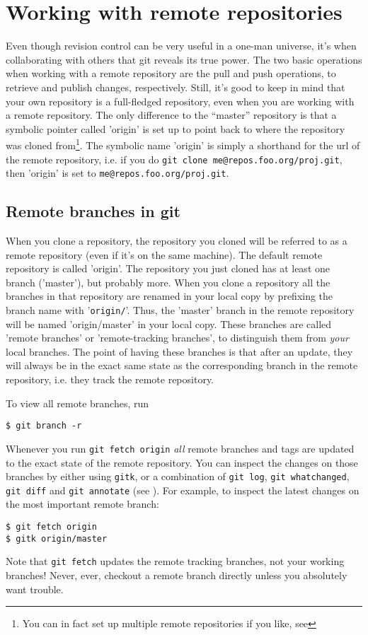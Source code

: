 \documentclass[a4paper,10pt]{article}
\begin{document}
\section{Working with remote repositories}
Even though revision control can be very useful in a one-man universe, it's
when collaborating with others that git reveals its true power.
The two basic operations when working with a remote repository are the pull
and push operations, to retrieve and publish changes, respectively. Still, it's
good to keep in mind that your own repository is a full-fledged repository,
even when you are working with a remote repository. The only difference to
the ``master'' repository is that a symbolic pointer called 'origin' is set
up to point back to where the repository was cloned from\footnote{You can in
fact set up multiple remote repositories if you like, see }.
The symbolic name 'origin' is simply a shorthand for the url of the remote
repository, i.e. if you do \texttt{git clone me@repos.foo.org/proj.git}, then
'origin' is set to \texttt{me@repos.foo.org/proj.git}.


\subsection{Remote branches in git}
\label{sec:branch}
When you clone a repository, the repository you cloned will be referred to as
a remote repository (even if it's on the same machine). The default remote
repository is called 'origin'. The repository you just cloned has at least one
branch ('master'), but probably more.
When you clone a repository all the branches in that repository are renamed 
in your local copy by prefixing the branch name with '\texttt{origin/}'. Thus,
the 'master' branch in the remote repository will be named 'origin/master' in
your local copy.
These branches are called 'remote
branches' or 'remote-tracking branches', 
to distinguish them from \emph{your} local
branches. The point of having these branches is that after an update, 
they will always be in the exact same state as the corresponding branch in the 
remote repository, i.e. they track the remote repository.

To view all remote branches, run
\begin{verbatim}
$ git branch -r
\end{verbatim}
Whenever you run
\texttt{git fetch origin} \emph{all} remote branches and tags 
are updated to the exact
state of the remote repository. You can inspect the changes on those
branches by either using \texttt{gitk}, or a combination of \texttt{git log},
\texttt{git whatchanged}, \texttt{git diff} and \texttt{git annotate} (see
).
For example, to inspect the latest changes on the most important remote branch:
\begin{verbatim}
$ git fetch origin
$ gitk origin/master
\end{verbatim}
Note that \texttt{git fetch} updates the remote
tracking branches, not your working branches!  Never, ever, checkout a remote
branch directly unless you absolutely want trouble. 
\end{document}
